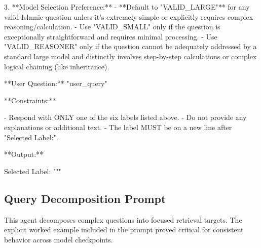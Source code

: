 \documentclass[11pt]{article}
\begin{document}
\begin{PromptBlock}
3. **Model Selection Preference:**
   - **Default to "VALID_LARGE"** for any valid Islamic question unless it's extremely simple or explicitly requires complex reasoning/calculation.
   - Use "VALID_SMALL" only if the question is exceptionally straightforward and requires minimal processing.
   - Use "VALID_REASONER" only if the question cannot be adequately addressed by a standard large model and distinctly involves step-by-step calculations or complex logical chaining (like inheritance).

**User Question:** "{user_query}"

**Constraints:**

- Respond with ONLY one of the six labels listed above.
- Do not provide any explanations or additional text.
- The label MUST be on a new line after "Selected Label:".

**Output:**

Selected Label: """
\end{PromptBlock}

\subsection{Query Decomposition Prompt}

This agent decomposes complex questions into focused retrieval targets. The explicit worked example included in the prompt proved critical for consistent behavior across model checkpoints.
\end{document}
